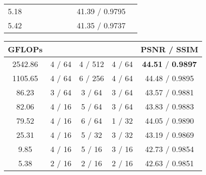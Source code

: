 \documentclass[final]{cvpr}
\begin{document}
\begin{table*}[ht!]
\begin{subtable}{\columnwidth}
\begin{tabular}{ccccccccc}
                5.18&  &   &  &  &   &      & 41.39 / 0.9795 \\
                5.42&  &       &     &      &       &  & 41.35 / 0.9737 \\
                \hline              
            \end{tabular}
            \caption{Network structure.}
            \label{tab:structure}
        \end{subtable}
\begin{subtable}{\columnwidth}
            \centering
            \setlength{\tabcolsep}{6pt}
            \begin{tabular}{ccccc}
                \hline
                GFLOPs         &  &  &  & PSNR / SSIM                       \\
                \hline  \hline
                2542.86        & 4 / 64          & 4 / 512         & 4 / 64          & \textbf{44.51} / \textbf{0.9897}  \\
                1105.65        & 4 / 64          & 6 / 256         & 4 / 64          & 44.48 / 0.9895                    \\
                \hline
                86.23          & 3 / 64          & 3 / 64          & 3 / 64          & 43.57 / 0.9881                    \\
                82.06          & 4 / 16          & 5 / 64          & 3 / 64          & 43.83 / 0.9883                    \\
                79.52          & 4 / 16          & 6 / 64          & 1 / 32          & 44.05 / 0.9890                    \\
                25.31          & 4 / 16          & 5 / 32          & 3 / 32          & 43.19 / 0.9869                    \\
                \hline
                9.85           & 4 / 16          & 5 / 16          & 3 / 16          & 42.73 / 0.9854                    \\
                \rowcolor{LightYellow}
                5.38           & 2 / 16          & 2 / 16          & 2 / 16          & 42.63 / 0.9851                    \\
                \hline
            \end{tabular}
            \caption{Number of convolutions / number of filters.}
            \label{tab:distribution}
        \end{subtable}
        \caption{Ablation study of the proposed EMVD evaluated on the raw CRVD dataset~\cite{yue2020supervised}.}
        \label{tab:ablation}
    \end{table*}
    
\end{document}

